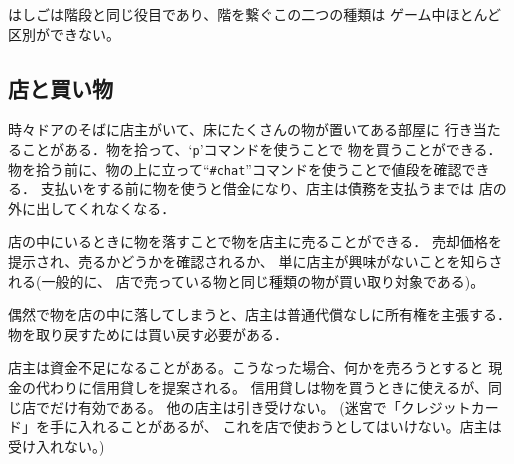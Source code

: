 はしごは階段と同じ役目であり、階を繋ぐこの二つの種類は
ゲーム中ほとんど区別ができない。

\subsection*{店と買い物}

時々ドアのそばに店主がいて、床にたくさんの物が置いてある部屋に
行き当たることがある．物を拾って、`{\tt p}'コマンドを使うことで
物を買うことができる．
物を拾う前に、物の上に立って``{\tt \#chat}''コマンドを使うことで値段を確認できる．
支払いをする前に物を使うと借金になり、店主は債務を支払うまでは
店の外に出してくれなくなる．

店の中にいるときに物を落すことで物を店主に売ることができる．
売却価格を提示され、売るかどうかを確認されるか、
単に店主が興味がないことを知らされる(一般的に、
店で売っている物と同じ種類の物が買い取り対象である)。

偶然で物を店の中に落してしまうと、店主は普通代償なしに所有権を主張する．
物を取り戻すためには買い戻す必要がある．

店主は資金不足になることがある。こうなった場合、何かを売ろうとすると
現金の代わりに信用貸しを提案される。
信用貸しは物を買うときに使えるが、同じ店でだけ有効である。
他の店主は引き受けない。
(迷宮で「クレジットカード」を手に入れることがあるが、
これを店で使おうとしてはいけない。店主は受け入れない。)

